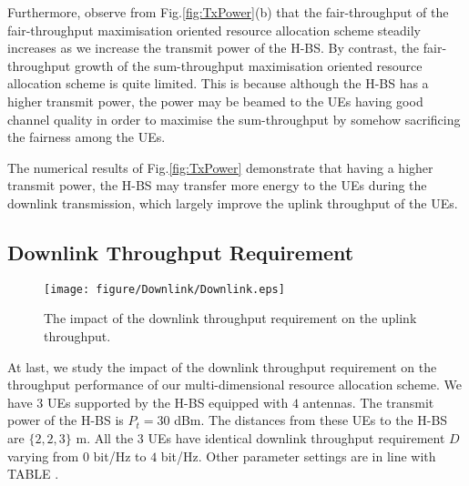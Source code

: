 \documentclass[12pt,draftcls,onecolumn,journal]{IEEEtran}
\begin{document}
Furthermore, observe from Fig.\ref{fig:TxPower}(b) that the fair-throughput of the fair-throughput maximisation oriented resource allocation scheme steadily increases as we increase the transmit power of the H-BS. By contrast, the fair-throughput growth of the sum-throughput maximisation oriented resource allocation scheme is quite limited. This is because although the H-BS has a higher transmit power, the power may be beamed to the UEs having good channel quality in order to maximise the sum-throughput by somehow sacrificing the fairness among the UEs.

The numerical results of Fig.\ref{fig:TxPower} demonstrate that having a higher transmit power, the H-BS may transfer more energy to the UEs during the downlink transmission, which largely improve the uplink throughput of the UEs. 

\subsection{Downlink Throughput Requirement}

\begin{figure}[!t]
\centering
\texttt{[image: figure/Downlink/Downlink.eps]}
\setlength{\abovecaptionskip}{0pt}
\setlength{\belowcaptionskip}{0pt}\caption{The impact of the downlink throughput requirement on the uplink throughput.}
\label{fig:Downlink}
\end{figure}

At last, we study the impact of the downlink throughput requirement on the throughput performance of our multi-dimensional resource allocation scheme. We have $3$ UEs supported by the H-BS equipped with $4$ antennas. The transmit power of the H-BS is $P_t = 30$ dBm. The distances from these UEs to the H-BS are $\{2,2,3\}$ m. All the $3$ UEs have identical downlink throughput requirement $D$ varying from $0$ bit/Hz to $4$ bit/Hz. Other parameter settings are in line with TABLE \uppercase\expandafter{}.
\end{document}
